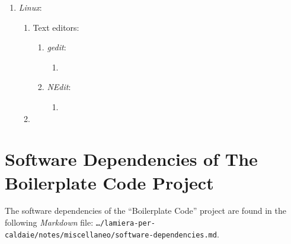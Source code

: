 \begin{enumerate}
\begin{enumerate}
\begin{enumerate}
		\end{enumerate}
	\end{enumerate}
\item {\it Linux}: \vspace{-0.3cm}
	\begin{enumerate} \itemsep -2pt
	\item Text editors: \vspace{-0.2cm}
		\begin{enumerate} \itemsep -2pt
		\item {\it gedit}: \vspace{-0.1cm}
			\begin{enumerate} \itemsep -1pt
			\item 
			\end{enumerate}
		\item {\it NEdit}: \vspace{-0.1cm}
			\begin{enumerate} \itemsep -1pt
			\item 
			\end{enumerate}
		\end{enumerate}
	\item 
	\end{enumerate}
\end{enumerate}








\section{Software Dependencies of The Boilerplate Code Project}
\label{sec:SoftwareDependenciesOfTheBoilerplateCodeProject}


The software dependencies of the ``Boilerplate Code'' project are found in the following {\it Markdown} file: {\tt \dots/lamiera-per-caldaie/notes/miscellaneo/software-dependencies.md}.















